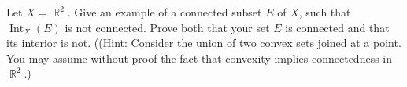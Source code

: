 \documentclass[12pt,letterpaper,boxed]{hmcpset}
\DeclareMathOperator{\Int}{Int}
\DeclareMathOperator{\R}{\mathbb{R}}
\begin{document}
\begin{problem}[Exercise 5.13]
Let $X = \R^{2}$. Give an example of a connected subset $E$ of $X$, such that $\Int_X(E)$ is not connected. Prove both that your set $E$ is connected and that its interior is not. ((Hint: Consider the
union of two convex sets joined at a point. You may assume without proof the fact that convexity implies
connectedness in $\R^{2}$.)
\end{problem}

\begin{solution}
 
\end{solution}
\end{document}
